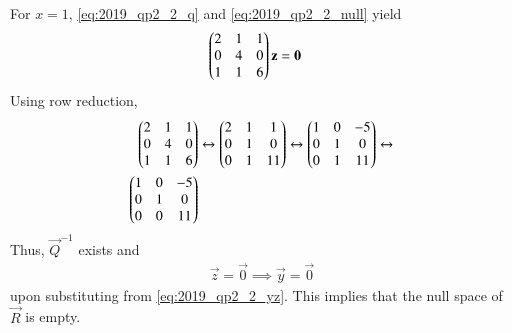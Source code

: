 \documentclass[journal,12pt,twocolumn]{IEEEtran}
\renewcommand\thesection{\arabic{section}}
\begin{document}
\begin{enumerate}[label=\thesection.\arabic*
,ref=\thesection.\theenumi]
\begin{align}
\end{align}
For $x=1$, \eqref{eq:2019_qp2_2_q} and \eqref{eq:2019_qp2_2_null} yield
\begin{align}
\label{eq:2019_qp2_2_x1}
\begin{pmatrix}2 & 1 & 1 \\ 0 & 4 & 0 \\ 1 & 1 & 6\end{pmatrix}\mathbf{z} &= \mathbf{0} 
\end{align}
Using row reduction,
\begin{align}
\begin{pmatrix}2 & 1 & 1 \\ 0 & 4 & 0 \\ 1 & 1 & 6\end{pmatrix} &\leftrightarrow
\begin{pmatrix}2 & 1 & 1 \\ 0 & 1 & 0 \\ 0 & 1 & 11\end{pmatrix} \leftrightarrow
\begin{pmatrix}1 & 0 & -5 \\ 0 & 1 & 0 \\ 0 & 1 & 11\end{pmatrix} \leftrightarrow
\nonumber \\
\begin{pmatrix}1 & 0 & -5 \\ 0 & 1 & 0 \\ 0 & 0 & 11\end{pmatrix} &
\end{align}
%
Thus, $\vec{Q}^{-1}$ exists and 
\begin{align}
\vec{z} = \vec{0} \implies \vec{y}= \vec{0}
\end{align}
upon substituting from \eqref{eq:2019_qp2_2_yz}.
This implies that the null space of $\vec{R}$ is empty. 

\end{enumerate}
\end{document}
